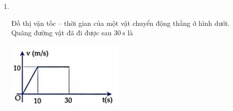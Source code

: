 \begin{enumerate}[label=\bfseries Câu \arabic*:]
\item {}\\
{\begin{minipage}[l]{0.7\textwidth}
		Đồ thị vận tốc – thời gian của một vật chuyển động thẳng ở hình dưới. Quãng đường vật đã đi được sau $\SI{30}{\second}$ là
	\end{minipage}
	\begin{minipage}{0.3\textwidth}
		\begin{center}
			\includegraphics[width=1.0\linewidth]{../figs/VN10-2022-PH-TP008-P-2}
		\end{center}
	\end{minipage}
}


\end{enumerate}
